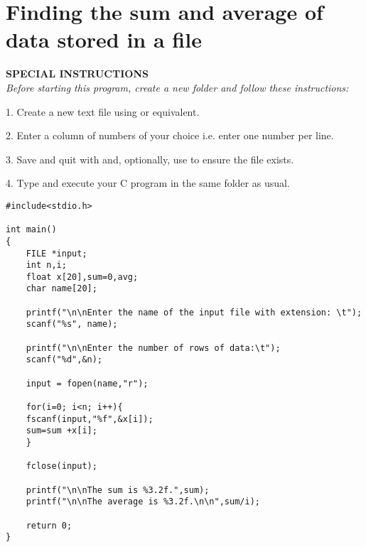 \documentclass[11pt,oneside]{article}
\newcommand{\info}[1]{\textbf{\scriptsize{\sffamily\addfontfeatures{LetterSpace=7} #1\\[.35em]}}}
\begin{document}
\section{Finding the sum and average of data stored in a file}
\begin{infobox}
\info{\MakeUppercase{Special instructions}}
\textit{Before starting this program, create a new folder and follow these instructions:}

1. Create a new text file using  or equivalent.

2. Enter a column of numbers of your choice i.e. enter one number per line.

3. Save and quit with  and, optionally, use  to ensure the file exists.

4. Type and execute your C program in the same folder as usual.
\end{infobox}
\begin{lstlisting}
#include<stdio.h>

int main()
{
    FILE *input;
    int n,i;
    float x[20],sum=0,avg;
    char name[20];
    
    printf("\n\nEnter the name of the input file with extension: \t");
    scanf("%s", name);
    
    printf("\n\nEnter the number of rows of data:\t");
    scanf("%d",&n);
    
    input = fopen(name,"r");
    
    for(i=0; i<n; i++){
	fscanf(input,"%f",&x[i]);
	sum=sum +x[i];
    }
    
    fclose(input);
    
    printf("\n\nThe sum is %3.2f.",sum);
    printf("\n\nThe average is %3.2f.\n\n",sum/i);
    
    return 0;
}
\end{lstlisting}
\end{document}
